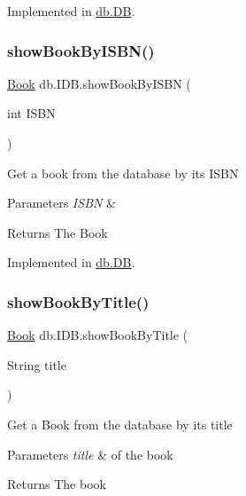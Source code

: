 Implemented in \hyperlink{classdb_1_1_d_b_a76fac3ed38eaecd5a073224d6ad51332}{db.\+DB}.

\mbox{\label{interfacedb_1_1_i_d_b_aed305f6c36ff140084636a8eded479db}} 
\subsubsection{\texorpdfstring{show\+Book\+By\+I\+S\+B\+N()}{showBookByISBN()}}
{\footnotesize\ttfamily \hyperlink{classserver_1_1data_1_1_book}{Book} db.\+I\+D\+B.\+show\+Book\+By\+I\+S\+BN (\begin{DoxyParamCaption}\item[{int}]{I\+S\+BN }\end{DoxyParamCaption})}

Get a book from the database by its I\+S\+BN 
\begin{DoxyParams}{Parameters}
{\em I\+S\+BN} & \\
\hline
\end{DoxyParams}
\begin{DoxyReturn}{Returns}
The Book 
\end{DoxyReturn}


Implemented in \hyperlink{classdb_1_1_d_b_ae902ce95ca7433f1f7f77419f4121f4c}{db.\+DB}.

\mbox{\label{interfacedb_1_1_i_d_b_a6418edaf7c25f99f0422c0000db521fa}} 
\subsubsection{\texorpdfstring{show\+Book\+By\+Title()}{showBookByTitle()}}
{\footnotesize\ttfamily \hyperlink{classserver_1_1data_1_1_book}{Book} db.\+I\+D\+B.\+show\+Book\+By\+Title (\begin{DoxyParamCaption}\item[{String}]{title }\end{DoxyParamCaption})}

Get a Book from the database by its title 
\begin{DoxyParams}{Parameters}
{\em title} & of the book \\
\hline
\end{DoxyParams}
\begin{DoxyReturn}{Returns}
The book 
\end{DoxyReturn}


